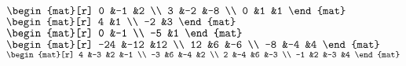 \begin{Answer}
\Question $\begin{mat}[r]
             0  &-1  &2  \\
             3  &-2  &-8 \\
             0  &1   &1            
          \end{mat}$
\Question $\begin{mat}[r]
            4  &1  \\
           -2  &3
          \end{mat}$
\Question $\begin{mat}[r]
               0  &-1 \\
              -5  &1
          \end{mat}$
\Question $\begin{mat}[r]
            -24  &-12  &12  \\
             12  &6    &-6   \\
             -8  &-4   &4
          \end{mat}$
\Question $\begin{mat}[r]
        4  &-3  &2  &-1  \\
       -3  &6   &-4 &2   \\
        2  &-4  &6  &-3  \\
        -1 &2  &-3  &4
      \end{mat}$


\end{Answer}

